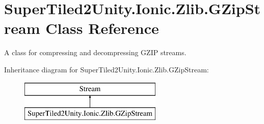 \hypertarget{class_super_tiled2_unity_1_1_ionic_1_1_zlib_1_1_g_zip_stream}{}\section{Super\+Tiled2\+Unity.\+Ionic.\+Zlib.\+G\+Zip\+Stream Class Reference}
\label{class_super_tiled2_unity_1_1_ionic_1_1_zlib_1_1_g_zip_stream}


A class for compressing and decompressing G\+Z\+IP streams.  


Inheritance diagram for Super\+Tiled2\+Unity.\+Ionic.\+Zlib.\+G\+Zip\+Stream\+:\begin{figure}[H]
\begin{center}
\leavevmode
\includegraphics[height=2.000000cm]{class_super_tiled2_unity_1_1_ionic_1_1_zlib_1_1_g_zip_stream}
\end{center}
\end{figure}
